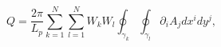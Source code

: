 \begin{equation}
Q=\frac{2\pi }{L_p}\sum_{k=1}^N\sum_{l=1}^NW_kW_l\oint_{\gamma
_k}\oint_{\gamma _l}\partial _iA_jdx^idy^j,  \label{CSact4}
\end{equation}

